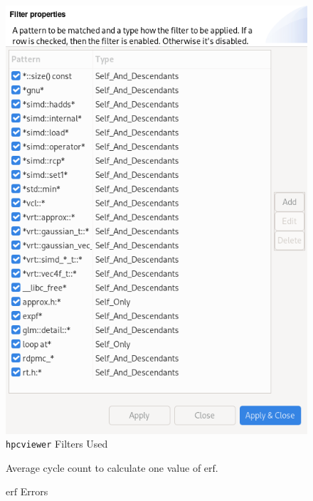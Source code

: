 \documentclass[a4paper, 11pt]{memoir}
\newcommand*{\erf}{\text{erf}}
\begin{document}
    \begin{figure}[ht]
        \centering
        \includegraphics[scale=0.4]{images/filters.png}
        \caption{\texttt{hpcviewer} Filters Used}
        \label{fig:hpc_filters}
    \end{figure}

    \begin{figure}[ht]
        \centering
        
        \caption{Average cycle count to calculate one value of $\erf$.}
        \label{fig:cycles_erf}
    \end{figure}

    \begin{figure}[ht]
        \centering
        
        \caption{$\erf$ Errors}
        \label{fig:erf_errors}
    \end{figure}
\end{document}
